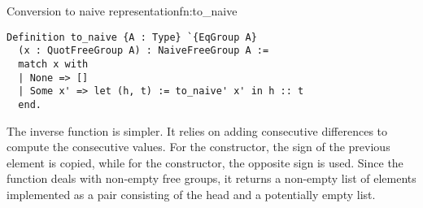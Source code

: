 \begin{func}{Conversion to naive representation}{fn:to_naive}
\begin{verbatim}
Definition to_naive {A : Type} `{EqGroup A} 
  (x : QuotFreeGroup A) : NaiveFreeGroup A :=
  match x with
  | None => []
  | Some x' => let (h, t) := to_naive' x' in h :: t
  end.
\end{verbatim}
\end{func}
The inverse function  is simpler. It relies on adding consecutive differences to compute the consecutive values. For the  constructor, the sign of the previous element is copied, while for the  constructor, the opposite sign is used. Since the  function deals with non-empty free groups, it returns a non-empty list of elements implemented as a pair consisting of the head and a potentially empty list.
